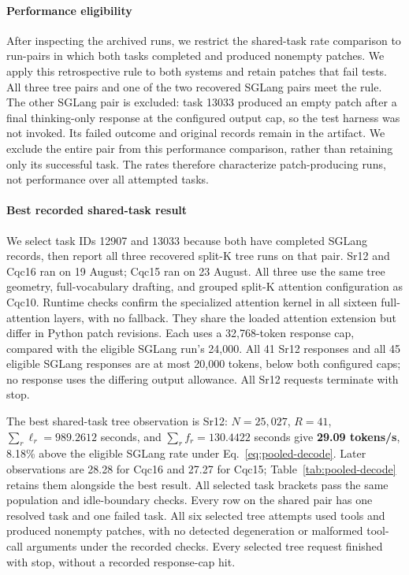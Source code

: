 \paragraph{Performance eligibility}
After inspecting the archived runs, we restrict the shared-task rate comparison to run-pairs in which both tasks completed and produced nonempty patches. We apply this retrospective rule to both systems and retain patches that fail tests. All three tree pairs and one of the two recovered SGLang pairs meet the rule. The other SGLang pair is excluded: task 13033 produced an empty patch after a final thinking-only response at the configured output cap, so the test harness was not invoked. Its failed outcome and original records remain in the artifact. We exclude the entire pair from this performance comparison, rather than retaining only its successful task. The rates therefore characterize patch-producing runs, not performance over all attempted tasks.

\paragraph{Best recorded shared-task result}
We select task IDs 12907 and 13033 because both have completed SGLang records, then report all three recovered split-K tree runs on that pair. Sr12 and Cqc16 ran on 19 August; Cqc15 ran on 23 August. All three use the same tree geometry, full-vocabulary drafting, and grouped split-K attention configuration as Cqc10. Runtime checks confirm the specialized attention kernel in all sixteen full-attention layers, with no fallback. They share the loaded attention extension but differ in Python patch revisions. Each uses a 32,768-token response cap, compared with the eligible SGLang run's 24,000. All 41 Sr12 responses and all 45 eligible SGLang responses are at most 20,000 tokens, below both configured caps; no response uses the differing output allowance. All Sr12 requests terminate with stop.

The best shared-task tree observation is Sr12: $N=25{,}027$, $R=41$, $\sum_r\ell_r=989.2612$ seconds, and $\sum_r f_r=130.4422$ seconds give \textbf{29.09 tokens/s}, 8.18\% above the eligible SGLang rate under Eq.~\ref{eq:pooled-decode}. Later observations are 28.28 for Cqc16 and 27.27 for Cqc15; Table~\ref{tab:pooled-decode} retains them alongside the best result. All selected task brackets pass the same population and idle-boundary checks. Every row on the shared pair has one resolved task and one failed task. All six selected tree attempts used tools and produced nonempty patches, with no detected degeneration or malformed tool-call arguments under the recorded checks. Every selected tree request finished with stop, without a recorded response-cap hit.

